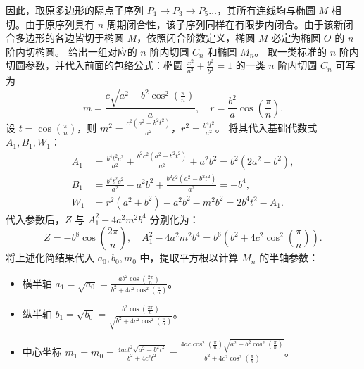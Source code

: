 \begin{solution}
因此，取原多边形的隔点子序列 $P_1 \to P_3 \to P_5 \dots$，其所有连线均与椭圆 $M$ 相切。由于原序列具有 $n$ 周期闭合性，该子序列同样在有限步内闭合。由于该新闭合多边形的各边皆切于椭圆 $M$，依照闭合阶数定义，椭圆 $M$ 必定为椭圆 $O$ 的 $n$ 阶内切椭圆。
给出一组对应的 $n$ 阶内切圆 $C_n$ 和椭圆 $M_n$。
取一类标准的 $n$ 阶内切圆参数，并代入前面的包络公式：椭圆 $\frac{x^2}{a^2}+\frac{y^2}{b^2}=1$ 的一类 $n$ 阶内切圆 $C_n$ 可写为
\[ m = \frac{c\sqrt{a^2 - b^2\cos^2(\frac{\pi}{n})}}{a}, \quad r = \frac{b^2}{a}\cos\left(\frac{\pi}{n}\right). \]
设 $t = \cos\left(\frac{\pi}{n}\right)$，则 $m^2 = \frac{c^2(a^2 - b^2 t^2)}{a^2}$，$r^2 = \frac{b^4 t^2}{a^2}$。
将其代入基础代数式 $A_1, B_1, W_1$：
\begin{align*}
A_1 &= \frac{b^4 t^2 c^2}{a^2} + \frac{b^2 c^2(a^2 - b^2 t^2)}{a^2} + a^2 b^2 = b^2(2a^2 - b^2), \\
B_1 &= \frac{b^4 t^2 c^2}{a^2} - a^2 b^2 + \frac{b^2 c^2(a^2 - b^2 t^2)}{a^2} = -b^4, \\
W_1 &= r^2(a^2 + b^2) - a^2 b^2 - m^2 b^2 = 2b^4 t^2 - A_1.
\end{align*}
代入参数后，$Z$ 与 $A_1^2 - 4a^2 m^2 b^4$ 分别化为：
\[ Z = -b^8 \cos\left(\frac{2\pi}{n}\right), \quad A_1^2 - 4a^2 m^2 b^4 = b^6\left(b^2 + 4c^2 \cos^2\left(\frac{\pi}{n}\right)\right). \]
将上述化简结果代入 $a_0, b_0, m_0$ 中，提取平方根以计算 $M_n$ 的半轴参数：
\begin{itemize}
\item 横半轴 $a_1 = \sqrt{a_0} = \frac{ab^2\cos(\frac{2\pi}{n})}{b^2 + 4c^2\cos^2(\frac{\pi}{n})}$。
\item 纵半轴 $b_1 = \sqrt{b_0} = \frac{b^2\cos(\frac{2\pi}{n})}{\sqrt{b^2 + 4c^2\cos^2(\frac{\pi}{n})}}$。
\item 中心坐标 $m_1 = m_0 = \frac{4 a c t^2 \sqrt{a^2 - b^2 t^2}}{b^2 + 4c^2 t^2} = \frac{4ac\cos^2(\frac{\pi}{n})\sqrt{a^2 - b^2\cos^2(\frac{\pi}{n})}}{b^2 + 4c^2\cos^2(\frac{\pi}{n})}$。
\end{itemize}
\end{solution}

